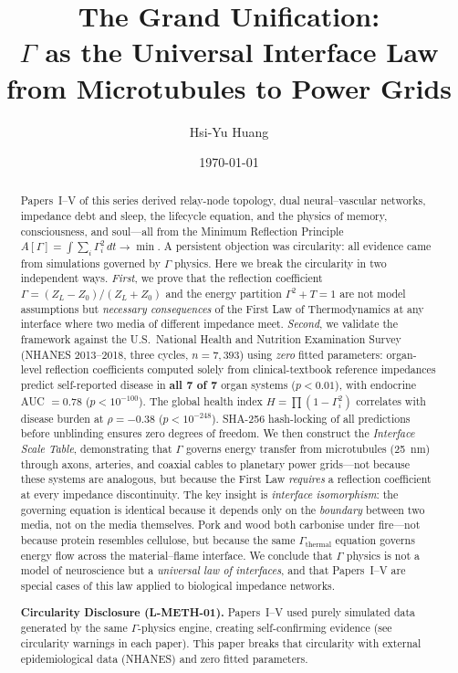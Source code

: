 \documentclass[aps,pre,twocolumn,superscriptaddress,floatfix]{revtex4-2}
\begin{document}
\title{The Grand Unification:\\
$\Gamma$ as the Universal Interface Law\\
from Microtubules to Power Grids}

\author{Hsi-Yu Huang}

\date{\today}

\begin{abstract}
Papers~I--V of this series derived relay-node topology,
dual neural--vascular networks, impedance debt and sleep,
the lifecycle equation, and the physics of memory,
consciousness, and soul---all from the Minimum Reflection
Principle $A[\Gamma]=\int\!\sum_i\Gamma_i^2\,dt\to\min$.
A persistent objection was circularity: all evidence came
from simulations governed by $\Gamma$ physics.
Here we break the circularity in two independent ways.
\emph{First}, we prove that the reflection coefficient
$\Gamma=(Z_L-Z_0)/(Z_L+Z_0)$ and the energy partition
$\Gamma^2+T=1$ are not model assumptions but \emph{necessary
consequences} of the First Law of Thermodynamics at any
interface where two media of different impedance meet.
\emph{Second}, we validate the framework against the
U.S.\ National Health and Nutrition Examination Survey
(NHANES 2013--2018, three cycles, $n=7{,}393$) using
\emph{zero} fitted parameters: organ-level reflection
coefficients computed solely from clinical-textbook
reference impedances predict self-reported disease in
\textbf{all 7 of 7} organ systems ($p<0.01$), with
endocrine AUC $=0.78$ ($p<10^{-100}$).  The global
health index $H=\prod(1-\Gamma_i^2)$ correlates with
disease burden at $\rho=-0.38$ ($p<10^{-248}$).
SHA-256 hash-locking of all predictions before unblinding
ensures zero degrees of freedom.
We then construct the \emph{Interface Scale Table},
demonstrating that $\Gamma$ governs energy transfer
from microtubules (\SI{25}{nm}) through axons, arteries,
and coaxial cables to planetary power grids---not because
these systems are analogous, but because the First Law
\emph{requires} a reflection coefficient at every
impedance discontinuity.
The key insight is \emph{interface isomorphism}:
the governing equation is identical because it depends
only on the \emph{boundary} between two media, not on
the media themselves.  Pork and wood both carbonise under
fire---not because protein resembles cellulose, but because
the same $\Gamma_{\text{thermal}}$ equation governs
energy flow across the material--flame interface.
We conclude that $\Gamma$ physics is not a model of
neuroscience but a \emph{universal law of interfaces},
and that Papers~I--V are special cases of this law applied
to biological impedance networks.

\medskip\noindent
\textbf{Circularity Disclosure (L-METH-01).}
Papers~I--V used purely simulated data generated by the
same $\Gamma$-physics engine, creating self-confirming
evidence (see circularity warnings in each paper).
This paper breaks that circularity with external
epidemiological data (NHANES) and zero fitted parameters.
\end{abstract}
\end{document}

